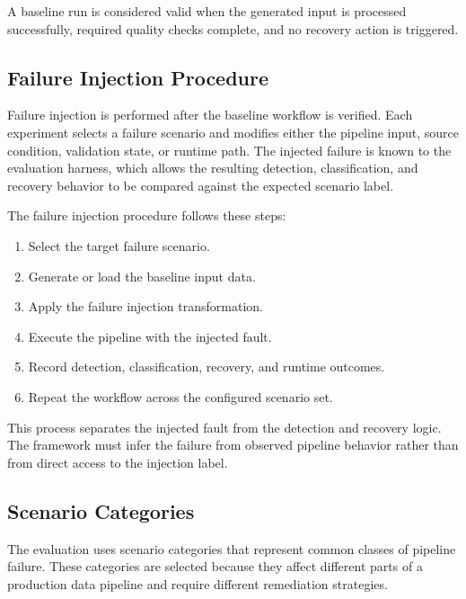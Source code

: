 A baseline run is considered valid when the generated input is processed successfully, required quality checks complete, and no recovery action is triggered.

\subsection{Failure Injection Procedure}

Failure injection is performed after the baseline workflow is verified. Each experiment selects a failure scenario and modifies either the pipeline input, source condition, validation state, or runtime path. The injected failure is known to the evaluation harness, which allows the resulting detection, classification, and recovery behavior to be compared against the expected scenario label.

The failure injection procedure follows these steps:

\begin{enumerate}
    \item Select the target failure scenario.
    \item Generate or load the baseline input data.
    \item Apply the failure injection transformation.
    \item Execute the pipeline with the injected fault.
    \item Record detection, classification, recovery, and runtime outcomes.
    \item Repeat the workflow across the configured scenario set.
\end{enumerate}

This process separates the injected fault from the detection and recovery logic. The framework must infer the failure from observed pipeline behavior rather than from direct access to the injection label.

\subsection{Scenario Categories}

The evaluation uses scenario categories that represent common classes of pipeline failure. These categories are selected because they affect different parts of a production data pipeline and require different remediation strategies.

